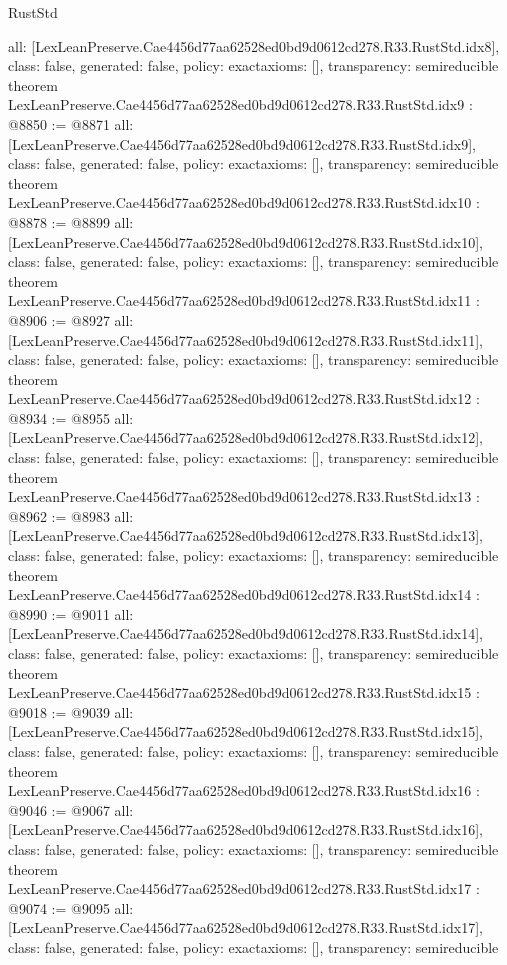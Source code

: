 \begin{lexlean}{RustStd}
\begin{coremodule}
{  all: [LexLeanPreserve.Cae4456d77aa62528ed0bd9d0612cd278.R33.RustStd.idx8],
  class: false,
  generated: false,
  policy: exact{axioms: []},
  transparency: semireducible
}
theorem LexLeanPreserve.Cae4456d77aa62528ed0bd9d0612cd278.R33.RustStd.idx9 : @8850 := @8871 {
  all: [LexLeanPreserve.Cae4456d77aa62528ed0bd9d0612cd278.R33.RustStd.idx9],
  class: false,
  generated: false,
  policy: exact{axioms: []},
  transparency: semireducible
}
theorem LexLeanPreserve.Cae4456d77aa62528ed0bd9d0612cd278.R33.RustStd.idx10 : @8878 := @8899 {
  all: [LexLeanPreserve.Cae4456d77aa62528ed0bd9d0612cd278.R33.RustStd.idx10],
  class: false,
  generated: false,
  policy: exact{axioms: []},
  transparency: semireducible
}
theorem LexLeanPreserve.Cae4456d77aa62528ed0bd9d0612cd278.R33.RustStd.idx11 : @8906 := @8927 {
  all: [LexLeanPreserve.Cae4456d77aa62528ed0bd9d0612cd278.R33.RustStd.idx11],
  class: false,
  generated: false,
  policy: exact{axioms: []},
  transparency: semireducible
}
theorem LexLeanPreserve.Cae4456d77aa62528ed0bd9d0612cd278.R33.RustStd.idx12 : @8934 := @8955 {
  all: [LexLeanPreserve.Cae4456d77aa62528ed0bd9d0612cd278.R33.RustStd.idx12],
  class: false,
  generated: false,
  policy: exact{axioms: []},
  transparency: semireducible
}
theorem LexLeanPreserve.Cae4456d77aa62528ed0bd9d0612cd278.R33.RustStd.idx13 : @8962 := @8983 {
  all: [LexLeanPreserve.Cae4456d77aa62528ed0bd9d0612cd278.R33.RustStd.idx13],
  class: false,
  generated: false,
  policy: exact{axioms: []},
  transparency: semireducible
}
theorem LexLeanPreserve.Cae4456d77aa62528ed0bd9d0612cd278.R33.RustStd.idx14 : @8990 := @9011 {
  all: [LexLeanPreserve.Cae4456d77aa62528ed0bd9d0612cd278.R33.RustStd.idx14],
  class: false,
  generated: false,
  policy: exact{axioms: []},
  transparency: semireducible
}
theorem LexLeanPreserve.Cae4456d77aa62528ed0bd9d0612cd278.R33.RustStd.idx15 : @9018 := @9039 {
  all: [LexLeanPreserve.Cae4456d77aa62528ed0bd9d0612cd278.R33.RustStd.idx15],
  class: false,
  generated: false,
  policy: exact{axioms: []},
  transparency: semireducible
}
theorem LexLeanPreserve.Cae4456d77aa62528ed0bd9d0612cd278.R33.RustStd.idx16 : @9046 := @9067 {
  all: [LexLeanPreserve.Cae4456d77aa62528ed0bd9d0612cd278.R33.RustStd.idx16],
  class: false,
  generated: false,
  policy: exact{axioms: []},
  transparency: semireducible
}
theorem LexLeanPreserve.Cae4456d77aa62528ed0bd9d0612cd278.R33.RustStd.idx17 : @9074 := @9095 {
  all: [LexLeanPreserve.Cae4456d77aa62528ed0bd9d0612cd278.R33.RustStd.idx17],
  class: false,
  generated: false,
  policy: exact{axioms: []},
  transparency: semireducible
}
\end{coremodule}
\end{lexlean}
